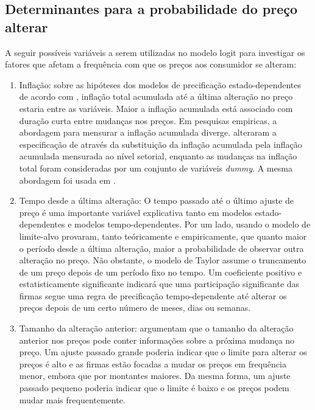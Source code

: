 \documentclass[twoside,a4paper,11pt]{report}
\begin{document}
\subsection*{Determinantes para a probabilidade do preço alterar}

A seguir possíveis variáveis a serem utilizadas no modelo logit para investigar os fatores que afetam a frequência com que os preços aos consumidor se alteram:

\begin{enumerate}
  \item Inflação: sobre as hipóteses dos modelos de precificação estado-dependentes de acordo com \citet{cecchetti1986frequency}, inflação total acumulada até a última alteração no preço estaria entre as variáveis. Maior a inflação acumulada está associado com duração curta entre mudanças nos preços. Em pesquisas empiricas, a abordagem para mensurar a inflação acumulada diverge. \citet{aucremanne2005time} alteraram a especificação de \citet{cecchetti1986frequency} através da substituição da inflação acumulada pela inflação acumulada mensurada ao nível setorial, enquanto as mudanças na inflação total foram consideradas por um conjunto de variáveis \emph{dummy}. A mesma abordagem foi usada em \citet{baumgartner2005frequently}.
  \item Tempo desde a última alteração: O tempo passado até o último ajuste de preço é uma importante variável explicativa tanto em modelos estado-dependentes e modelos tempo-dependentes. Por um lado, usando o modelo de limite-alvo \citet{cecchetti1986frequency} provaram, tanto teóricamente e empiricamente, que quanto maior o período desde a última alteração, maior a probabilidade de observar outra alteração no preço. Não obstante, o modelo de Taylor assume o truncamento de um preço depois de um período fixo no tempo. Um coeficiente positivo e estatisticamente significante indicará que uma participação significante das firmas segue uma regra de precificação tempo-dependente até alterar os preços depois de um certo número de meses, dias ou semanas.
  \item Tamanho da alteração anterior: \citet{cecchetti1986frequency} argumentam que o tamanho da alteração anterior nos preços pode conter informações sobre a próxima mudança no preço. Um ajuste passado grande poderia indicar que o limite para alterar os preços é alto e as firmas estão focadas a mudar os preços em frequência menor, embora que por montantes maiores. Da mesma forma, um ajuste passado pequeno poderia indicar que o limite é baixo e os preços podem mudar mais frequentemente. 

\end{enumerate}
\end{document}
